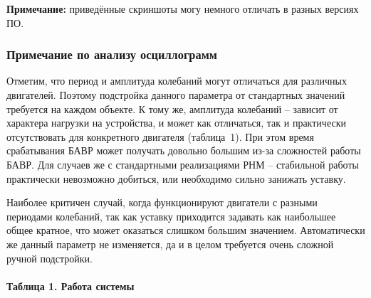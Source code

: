 \textbf{Примечание:} приведённые скриншоты могу немного отличать в разных версиях ПО.

\subsubsection{Примечание по анализу осциллограмм}

Отметим, что период и амплитуда колебаний могут отличаться для различных двигателей.
Поэтому подстройка данного параметра от стандартных значений требуется на каждом
объекте. К тому же, амплитуда колебаний -- зависит от характера нагрузки на устройства,
и может как отличаться, так и практически отсутствовать для конкретного двигателя
(таблица~1). При этом время срабатывания БАВР может получать довольно большим из-за
сложностей работы БАВР. Для случаев же с стандартными реализациями РНМ -- стабильной
работы практически невозможно добиться, или необходимо сильно занижать уставку.

Наиболее критичен случай, когда функционируют двигатели с разными периодами колебаний,
так как уставку приходится задавать как наибольшее общее кратное, что может оказаться
слишком большим значением. Автоматически же данный параметр не изменяется, да и в целом
требуется очень сложной ручной подстройки.

\paragraph{Таблица 1. Работа системы }
\label{tab:bavr_operation_title}


